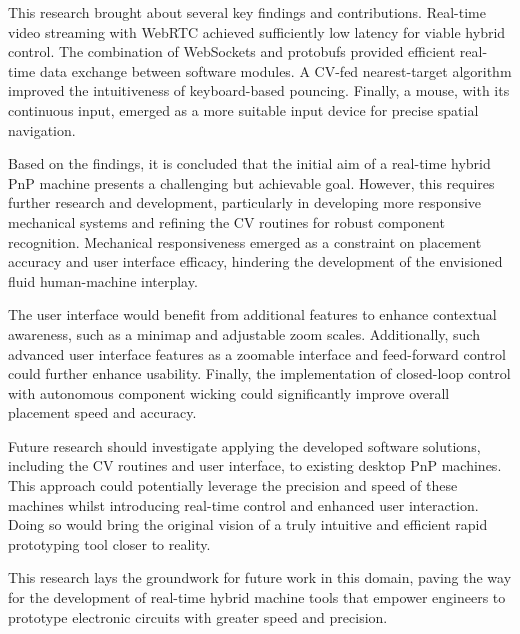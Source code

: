 \documentclass[12pt,british,UKenglish]{article}
\begin{document}
This research brought about several key findings and contributions.
Real-time video streaming with \ac{WebRTC} achieved sufficiently low latency for viable hybrid control.
The combination of WebSockets and \aclp{protobuf} provided efficient real-time data exchange between software modules.
A \ac{CV}-fed nearest-target algorithm improved the intuitiveness of keyboard-based pouncing.
Finally, a mouse, with its continuous input, emerged as a more suitable input device for precise spatial navigation.

Based on the findings, it is concluded that the initial aim of a real-time hybrid \ac{PnP} machine presents a challenging but achievable goal.
However, this requires further research and development, particularly in developing more responsive mechanical systems and refining the \ac{CV} routines for robust component recognition.
Mechanical responsiveness emerged as a constraint on placement accuracy and user interface efficacy, hindering the development of the envisioned fluid human-machine interplay.

The user interface would benefit from additional features to enhance contextual awareness, such as a minimap and adjustable zoom scales.
Additionally, such advanced user interface features as a zoomable interface and feed-forward control could further enhance usability.
Finally, the implementation of closed-loop control with autonomous component wicking could significantly improve overall placement speed and accuracy.

Future research should investigate applying the developed software solutions, including the \ac{CV} routines and user interface, to existing desktop \acl{PnP} machines.
This approach could potentially leverage the precision and speed of these machines whilst introducing real-time control and enhanced user interaction.
Doing so would bring the original vision of a truly intuitive and efficient rapid prototyping tool closer to reality.

This research lays the groundwork for future work in this domain, paving the way for the development of real-time hybrid machine tools that empower engineers to prototype electronic circuits with greater speed and precision.



\newpage{}


\end{document}
